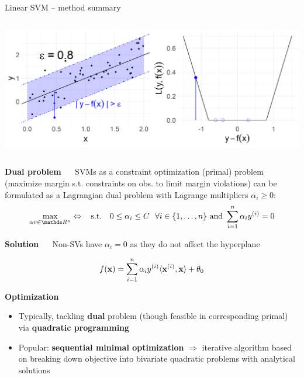 \documentclass[11pt,compress,t,notes=noshow, xcolor=table]{beamer}
\newcommand{\highlight}[1]{\textcolor{hlcol}{\textbf{#1}}}
\begin{document}
\begin{frame2}{Linear SVM -- method summary}
\begin{columns}[T, totalwidth = \textwidth]
\begin{column}{0.38\textwidth}
\includegraphics[height=\textwidth, keepaspectratio=true]{
figure/loss_eps_insensitive.png}

\end{column}
\end{columns}

\medskip

\highlight{Dual problem} ~~ %
SVMs as a constraint optimization (primal) problem (maximize margin s.t. constraints on obs. to limit margin violations) can be formulated as a Lagrangian dual problem with Lagrange multipliers $\alpha_i \geq 0$: %
$$\max\limits_{\alpha v \in \R^n} \Leftrightarrow \;\; \text{ s.t. } \;\; 0 \le \alpha_i \le C ~~ \forall i \in \nset \text{ and } \sum_{i=1}^n \alpha_i \yi = 0$$


\highlight{Solution} ~~ 
Non-SVs have $\alpha_i = 0$ as they do not affect the hyperplane

$$f(\mathbf{x}) = \sum\limits_{i=1}^n \alpha_i y^{(i)} \langle \mathbf{x}^{(i)}, \mathbf{x} \rangle  + \theta_0$$

\framebreak

\highlight{Optimization}

\begin{itemize}
\item Typically, tackling \textbf{dual} problem (though feasible 
in corresponding primal) via \textbf{quadratic programming}
\item Popular: \textbf{sequential minimal optimization} $\Rightarrow$ 
iterative algorithm based on breaking down objective into bivariate quadratic 
problems with analytical solutions
\end{itemize}
\medskip


\end{frame2}
\end{document}
